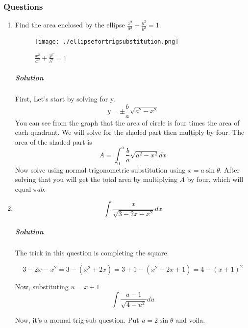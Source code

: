 \documentclass{article}
\begin{document}
	\subsubsection{Questions}
	\begin{enumerate}[1.]
		\item Find the area enclosed by the ellipse $ \frac{x^2}{a^2} + \frac{y^2}{b^2} = 1 $.

			\begin{figure}[h]
				\centering
				\texttt{[image: ./ellipsefortrigsubstitution.png]}
				\caption{ $ \frac{x^2}{a^2} + \frac{y^2}{b^2} = 1 $}
				\label{fig:-ellipsefortrigsubstitution-png}
			\end{figure}

			\subparagraph{Solution}
			First, Let's start by solving for y.
			\[
				y = \pm \frac{b}{a} \sqrt{ a^2 - x^2 }
			\]
			You can see from the graph that the area of circle is four times the area of each quadrant. We will solve for the shaded part then multiply by four. The area of the shaded part is
			\[
				A = \int^{a}_{0} \frac{b}{a} \sqrt{ a^2-x^2 } dx  
			\]
			Now solve using normal trigonometric substitution using $ x = a \sin{ \theta }  $. After solving that you will get the total area by multiplying $ A $ by four, which will equal $ \pi a b $.

		\item \[
				\int \frac{x}{ \sqrt{ 3-2x-x^2 } } dx
			\]

			\subparagraph{Solution}
			The trick in this question is completing the square.

			\[
				3-2x-x^2 = 3 - (x^2+2x)	= 3 + 1 - (x^2+2x+1) = 4 - (x+1)^2 
			\]

			Now, substituting $ u = x+1 $ 
			\[
				\int \frac{ u-1 }{ \sqrt{ 4 - u^2 } }  du
			\]

			Now, it's a normal trig-sub question. Put $ u = 2 \sin{ \theta }  $ and voila.



	\end{enumerate}
	\newpage



	\thispagestyle{empty}
\end{document}
